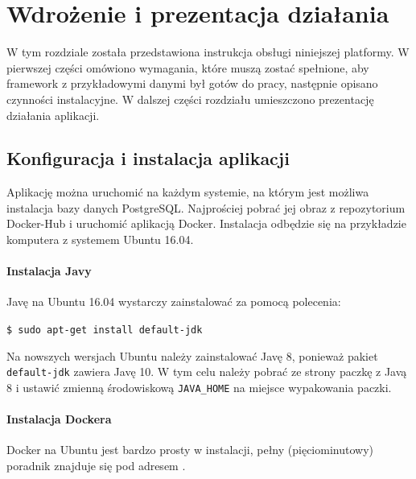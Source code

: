 \chapter{Wdrożenie i prezentacja działania}
\thispagestyle{chapterBeginStyle}

W tym rozdziale została przedstawiona instrukcja obsługi niniejszej platformy. W pierwszej części omówiono wymagania, które muszą zostać spełnione, aby framework z przykładowymi danymi był gotów do pracy, następnie opisano czynności instalacyjne. 
W dalszej części rozdziału umieszczono prezentację działania aplikacji.  

\section{Konfiguracja i instalacja aplikacji}
Aplikację można uruchomić na każdym systemie, na którym jest możliwa instalacja bazy danych PostgreSQL. Najprościej pobrać jej obraz z repozytorium Docker-Hub i uruchomić aplikacją Docker. Instalacja odbędzie się na przykładzie komputera z systemem Ubuntu 16.04. 

\subsubsection{Instalacja Javy}
Javę na Ubuntu 16.04 wystarczy zainstalować za pomocą polecenia:

\noindent
\texttt{\$ sudo apt-get install default-jdk}

\noindent
Na nowszych wersjach Ubuntu należy zainstalować Javę 8, ponieważ pakiet \texttt{default-jdk} zawiera Javę 10. W tym celu należy pobrać ze strony \cite{Java-doc} paczkę z Javą 8 i ustawić zmienną środowiskową \texttt{JAVA\_HOME} na miejsce wypakowania paczki. 

\subsubsection{Instalacja Dockera}
Docker na Ubuntu jest bardzo prosty w instalacji, pełny (pięciominutowy) poradnik znajduje się pod adresem \cite{docker-ins}.

